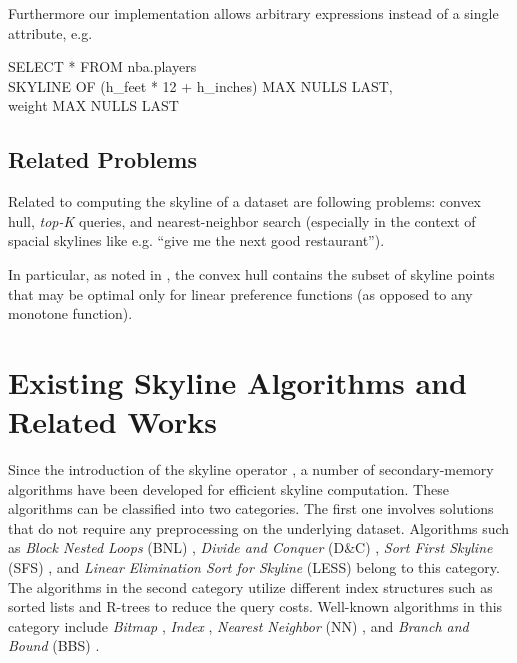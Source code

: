Furthermore our implementation allows arbitrary expressions instead of
a single attribute, e.g.

\begin{sql}
SELECT * FROM nba.players \\
SKYLINE OF (h\_feet * 12 + h\_inches) MAX NULLS LAST, \\
weight MAX NULLS LAST
\end{sql}


\section{Related Problems}
Related to computing the skyline of a dataset are following problems:
convex hull, \emph{top-K} queries, and nearest-neighbor search
(especially in the context of spacial skylines like e.g. ``give me the
next good restaurant'').

In particular, as noted in \citep{Papadias2005}, the convex hull
contains the subset of skyline points that may be optimal only for
linear preference functions (as opposed to any monotone function).






\chapter{Existing Skyline Algorithms and Related Works}
\label{chap:relatedworks}

Since the introduction of the skyline operator \citep{Borzsonyi2001}, a
number of secondary-memory algorithms have been developed for
efficient skyline computation. These algorithms can be classified into
two categories. The first one involves solutions that do not require
any preprocessing on the underlying dataset. Algorithms such as
{\em Block Nested Loops} (BNL) \citep{Borzsonyi2001}, 
{\em Divide and Conquer} (D\&C) \citep{Borzsonyi2001}, 
{\em Sort First Skyline} (SFS) \citep{Chomicki2003}, and
{\em Linear Elimination Sort for Skyline} (LESS) \citep{Godfrey2005}
belong to this category.
The algorithms in the second category utilize different index structures
such as sorted lists and R-trees to reduce the query costs.
Well-known algorithms in this category include 
{\em Bitmap} \citep{Tan2001}, 
{\em Index} \citep{Tan2001},
{\em Nearest Neighbor} (NN) \citep{Kossmann2002}, and
{\em Branch and Bound} (BBS) \citep{Papadias2003, Papadias2005}.

